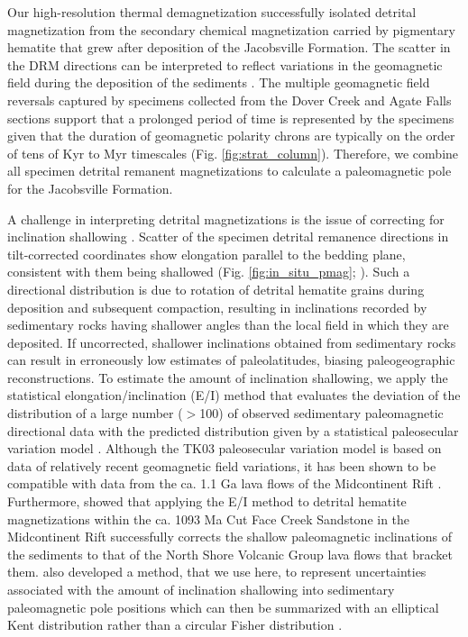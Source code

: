 Our high-resolution thermal demagnetization successfully isolated detrital magnetization from the secondary chemical magnetization carried by pigmentary hematite that grew after deposition of the Jacobsville Formation. The scatter in the DRM directions can be interpreted to reflect variations in the geomagnetic field during the deposition of the sediments \citep{Steiner1983a, Tauxe1984a}. The multiple geomagnetic field reversals captured by specimens collected from the Dover Creek and Agate Falls sections support that a prolonged period of time is represented by the specimens given that the duration of geomagnetic polarity chrons are typically on the order of tens of Kyr to Myr timescales (Fig. \ref{fig:strat_column}). Therefore, we combine all specimen detrital remanent magnetizations to calculate a paleomagnetic pole for the Jacobsville Formation.

A challenge in interpreting detrital magnetizations is the issue of correcting for inclination shallowing \citep{King1955a, Tauxe2004b, Bilardello2016b}. Scatter of the specimen detrital remanence directions in tilt-corrected coordinates show elongation parallel to the bedding plane, consistent with them being shallowed (Fig. \ref{fig:in_situ_pmag}; \cite{Tauxe2004b}). Such a directional distribution is due to rotation of detrital hematite grains during deposition and subsequent compaction, resulting in inclinations recorded by sedimentary rocks having shallower angles than the local field in which they are deposited. If uncorrected, shallower inclinations obtained from sedimentary rocks can result in erroneously low estimates of paleolatitudes, biasing paleogeographic reconstructions. To estimate the amount of inclination shallowing, we apply the statistical elongation/inclination (E/I) method that evaluates the deviation of the distribution of a large number ($>$100) of observed sedimentary paleomagnetic directional data with the predicted distribution given by a statistical paleosecular variation model \citep{Tauxe2004b}. Although the TK03 paleosecular variation model is based on data of relatively recent geomagnetic field variations, it has been shown to be compatible with data from the ca. 1.1 Ga lava flows of the Midcontinent Rift \citep{Tauxe2009a}. Furthermore, \cite{Pierce2022a} showed that applying the E/I method to detrital hematite magnetizations within the ca. 1093 Ma Cut Face Creek Sandstone in the Midcontinent Rift successfully corrects the shallow paleomagnetic inclinations of the sediments to that of the North Shore Volcanic Group lava flows that bracket them. \cite{Pierce2022a} also developed a method, that we use here, to represent uncertainties associated with the amount of inclination shallowing into sedimentary paleomagnetic pole positions which can then be summarized with an elliptical Kent distribution \citep{Kent1982a} rather than a circular Fisher distribution \citep{Fisher1953a}. 

